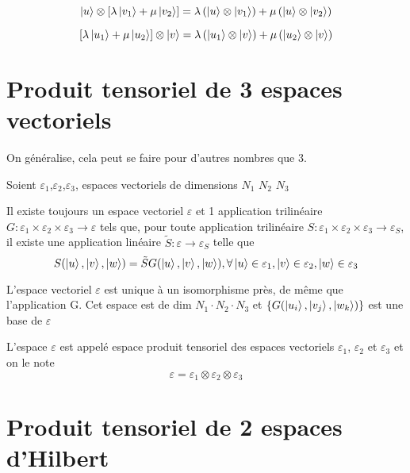 $$ \ket{u} \otimes \left[\lambda\ket{v_1} + \mu\ket{v_2}\right] = \lambda\left(\ket{u}\otimes\ket{v_1}\right) + \mu\left(\ket{u}\otimes\ket{v_2}\right) $$


$$ \left[\lambda\ket{u_1} + \mu\ket{u_2}\right] \otimes \ket{v}  = \lambda\left(\ket{u_1}\otimes\ket{v}\right) + \mu\left(\ket{u_2}\otimes\ket{v}\right) $$

\section{Produit tensoriel de 3 espaces vectoriels}

On généralise, cela peut se faire pour d'autres nombres que 3.

Soient $\varepsilon_1$,$\varepsilon_2$,$\varepsilon_3$, espaces vectoriels de dimensions $N_1$ $N_2$ $N_3$

\begin{thm}
	Il existe toujours un espace vectoriel $\varepsilon$ et 1 application trilinéaire $G: \varepsilon_1 \times \varepsilon_2 \times \varepsilon_3 \rightarrow \varepsilon$ tels que, pour toute application trilinéaire $S: \varepsilon_1 \times \varepsilon_2 \times\varepsilon_3\rightarrow \varepsilon_S$, il existe une application linéaire $\tilde{S} : \varepsilon \rightarrow \varepsilon_S$ telle que 
	$$ S(\ket{u},\ket{v},\ket{w})  = \tilde{S}G(\ket{u},\ket{v},\ket{w}), \forall \ket{u} \in \varepsilon_1,\ket{v} \in \varepsilon_2,\ket{w} \in \varepsilon_3$$
\end{thm}

\begin{thm}
	L'espace vectoriel $\varepsilon$ est unique à un isomorphisme près, de même que l'application G. Cet espace est de dim $N_1 \cdot N_2\cdot N_3$ et $ \{ G(\ket{u_i},\ket{v_j},\ket{w_k}) \} $ est une base de $ \varepsilon $
\end{thm}

\begin{definition}
	L'espace $\varepsilon$ est appelé espace produit tensoriel des espaces vectoriels $\varepsilon_1$, $\varepsilon_2$ et $\varepsilon_3$ et on le note
	$$ \varepsilon = \varepsilon_1 \otimes \varepsilon_2 \otimes \varepsilon_3 $$
\end{definition}

\section{Produit tensoriel de 2 espaces d'Hilbert}


